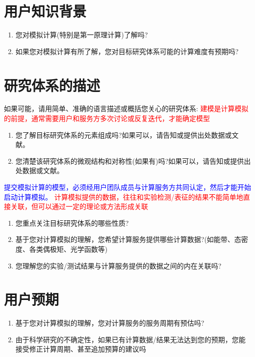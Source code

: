 \section{用户知识背景}
\begin{enumerate}[(1)]
		\setlength{\parskip}{30pt}
	\item 您对模拟计算(特别是第一原理计算)了解吗?
	\item 如果您对模拟计算有所了解，您对目标研究体系可能的计算难度有预期吗?
\end{enumerate}
\vskip 20pt

\section{研究体系的描述}
\noindent 如果可能，请用简单、准确的语言描述或概括您关心的研究体系:
\vskip 40pt
\noindent\textcolor{red}{建模是计算模拟的前提，通常需要用户和服务方多次讨论或反复迭代，才能确定模型}
\begin{enumerate}[(1)]
		\setlength{\itemsep}{30pt}
	\item 您了解目标研究体系的元素组成吗?如果可以，请告知或提供出处数据或文献。
	\item 您清楚该研究体系的微观结构和对称性(如果有)吗?如果可以，请告知或提供出处数据或文献。
\end{enumerate}
\vskip 20pt
{\heiti \footnotesize{\textcolor{blue}{提交模拟计算的模型，必须经用户团队成员与计算服务方共同认定，然后才能开始启动计算模拟。}}}
\vskip 10pt
\noindent\textcolor{red}{计算模拟提供的数据，往往和实验检测/表征的结果不能简单地直接关联，但可以通过一定的理论或方法形成关联}
\begin{enumerate}[(1)]
		\setlength{\itemsep}{30pt}
	\item 您重点关注目标研究体系的哪些性质?
	\item 基于您对计算模拟的理解，您希望计算服务提供哪些计算数据?(如能带、态密度、各类偶极矩、光学函数等)
	\item 您理解您的实验/测试结果与计算服务提供的数据之间的内在关联吗?
\end{enumerate}
\vspace*{25pt}

\section{用户预期}
\begin{enumerate}[(1)]
		\setlength{\itemsep}{30pt}
 	\item 基于您对计算模拟的理解，您对计算服务的服务周期有预估吗?
	\item 由于科学研究的不确定性，如果已有计算数据/结果无法达到您的预期，您能接受修正计算周期、甚至追加预算的建议吗
\end{enumerate}
